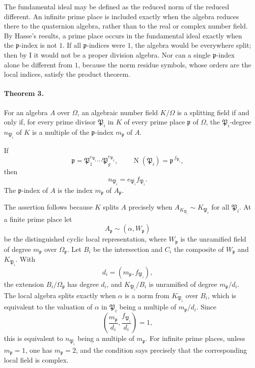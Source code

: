 \documentclass[11pt]{article}
\providecommand{\Om}{\Omega}
\providecommand{\N}{\operatorname{N}}
\begin{document}
The fundamental ideal may be defined as the reduced norm of the reduced different. An infinite prime place is included exactly when the algebra reduces there to the quaternion algebra, rather than to the real or complex number field. By Hasse's results, a prime place occurs in the fundamental ideal exactly when the \(\mathfrak p\)-index is not \(1\). If all \(\mathfrak p\)-indices were \(1\), the algebra would be everywhere split; then by I it would not be a proper division algebra. Nor can a single \(\mathfrak p\)-index alone be different from \(1\), because the norm residue symbols, whose orders are the local indices, satisfy the product theorem.

\paragraph{Theorem 3.}
For an algebra \(A\) over \(\Om\), an algebraic number field \(K/\Om\) is a splitting field if and only if, for every prime divisor \(\mathfrak P_i\) in \(K\) of every prime place \(\mathfrak p\) of \(\Om\), the \(\mathfrak P_i\)-degree \(n_{\mathfrak P_i}\) of \(K\) is a multiple of the \(\mathfrak p\)-index \(m_{\mathfrak p}\) of \(A\).

If
\[
        \mathfrak p=\mathfrak P_1^{e_{\mathfrak P_1}}\cdots
        \mathfrak P_g^{e_{\mathfrak P_g}},
        \qquad
        \N(\mathfrak P_i)=\mathfrak p^{\,f_{\mathfrak P_i}},
\]
then
\[
        n_{\mathfrak P_i}=e_{\mathfrak P_i}f_{\mathfrak P_i}.
\]
The \(\mathfrak p\)-index of \(A\) is the index \(m_{\mathfrak p}\) of \(A_{\mathfrak p}\).

The assertion follows because \(K\) splits \(A\) precisely when \(A_{K_{\mathfrak P_i}}\sim K_{\mathfrak P_i}\) for all \(\mathfrak P_i\). At a finite prime place let
\[
        A_{\mathfrak p}\sim(\alpha,W_{\mathfrak p})
\]
be the distinguished cyclic local representation, where \(W_{\mathfrak p}\) is the unramified field of degree \(m_{\mathfrak p}\) over \(\Om_{\mathfrak p}\). Let \(B_i\) be the intersection and \(C_i\) the composite of \(W_{\mathfrak p}\) and \(K_{\mathfrak P_i}\). With
\[
        d_i=(m_{\mathfrak p},f_{\mathfrak P_i}),
\]
the extension \(B_i/\Om_{\mathfrak p}\) has degree \(d_i\), and \(K_{\mathfrak P_i}/B_i\) is unramified of degree \(m_{\mathfrak p}/d_i\). The local algebra splits exactly when \(\alpha\) is a norm from \(K_{\mathfrak P_i}\) over \(B_i\), which is equivalent to the valuation of \(\alpha\) in \(\mathfrak P_i\) being a multiple of \(m_{\mathfrak p}/d_i\). Since
\[
        \left(\frac{m_{\mathfrak p}}{d_i},\frac{f_{\mathfrak P_i}}{d_i}\right)=1,
\]
this is equivalent to \(n_{\mathfrak P_i}\) being a multiple of \(m_{\mathfrak p}\). For infinite prime places, unless \(m_{\mathfrak p}=1\), one has \(m_{\mathfrak p}=2\), and the condition says precisely that the corresponding local field is complex.
\end{document}
